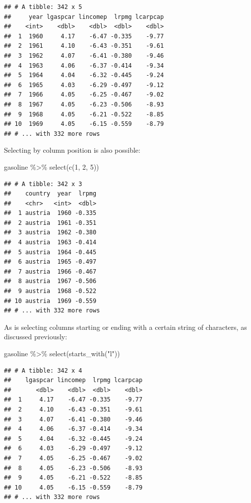\documentclass[
]{article}
\newenvironment{Shaded}{\begin{snugshade}}{\end{snugshade}}
\newcommand{\DecValTok}[1]{\textcolor[rgb]{0.00,0.00,0.81}{#1}}
\newcommand{\FunctionTok}[1]{\textcolor[rgb]{0.00,0.00,0.00}{#1}}
\newcommand{\NormalTok}[1]{#1}
\newcommand{\SpecialCharTok}[1]{\textcolor[rgb]{0.00,0.00,0.00}{#1}}
\newcommand{\StringTok}[1]{\textcolor[rgb]{0.31,0.60,0.02}{#1}}
\begin{document}
\begin{verbatim}
## # A tibble: 342 x 5
##     year lgaspcar lincomep  lrpmg lcarpcap
##    <int>    <dbl>    <dbl>  <dbl>    <dbl>
##  1  1960     4.17    -6.47 -0.335    -9.77
##  2  1961     4.10    -6.43 -0.351    -9.61
##  3  1962     4.07    -6.41 -0.380    -9.46
##  4  1963     4.06    -6.37 -0.414    -9.34
##  5  1964     4.04    -6.32 -0.445    -9.24
##  6  1965     4.03    -6.29 -0.497    -9.12
##  7  1966     4.05    -6.25 -0.467    -9.02
##  8  1967     4.05    -6.23 -0.506    -8.93
##  9  1968     4.05    -6.21 -0.522    -8.85
## 10  1969     4.05    -6.15 -0.559    -8.79
## # ... with 332 more rows
\end{verbatim}

Selecting by column position is also possible:

\begin{Shaded}
\begin{Highlighting}[]
\NormalTok{gasoline }\SpecialCharTok{\%\textgreater{}\%}
  \FunctionTok{select}\NormalTok{(}\FunctionTok{c}\NormalTok{(}\DecValTok{1}\NormalTok{, }\DecValTok{2}\NormalTok{, }\DecValTok{5}\NormalTok{))}
\end{Highlighting}
\end{Shaded}

\begin{verbatim}
## # A tibble: 342 x 3
##    country  year  lrpmg
##    <chr>   <int>  <dbl>
##  1 austria  1960 -0.335
##  2 austria  1961 -0.351
##  3 austria  1962 -0.380
##  4 austria  1963 -0.414
##  5 austria  1964 -0.445
##  6 austria  1965 -0.497
##  7 austria  1966 -0.467
##  8 austria  1967 -0.506
##  9 austria  1968 -0.522
## 10 austria  1969 -0.559
## # ... with 332 more rows
\end{verbatim}

As is selecting columns starting or ending with a certain string of characters, as discussed previously:

\begin{Shaded}
\begin{Highlighting}[]
\NormalTok{gasoline }\SpecialCharTok{\%\textgreater{}\%}
  \FunctionTok{select}\NormalTok{(}\FunctionTok{starts\_with}\NormalTok{(}\StringTok{"l"}\NormalTok{))}
\end{Highlighting}
\end{Shaded}

\begin{verbatim}
## # A tibble: 342 x 4
##    lgaspcar lincomep  lrpmg lcarpcap
##       <dbl>    <dbl>  <dbl>    <dbl>
##  1     4.17    -6.47 -0.335    -9.77
##  2     4.10    -6.43 -0.351    -9.61
##  3     4.07    -6.41 -0.380    -9.46
##  4     4.06    -6.37 -0.414    -9.34
##  5     4.04    -6.32 -0.445    -9.24
##  6     4.03    -6.29 -0.497    -9.12
##  7     4.05    -6.25 -0.467    -9.02
##  8     4.05    -6.23 -0.506    -8.93
##  9     4.05    -6.21 -0.522    -8.85
## 10     4.05    -6.15 -0.559    -8.79
## # ... with 332 more rows
\end{verbatim}
\end{document}
